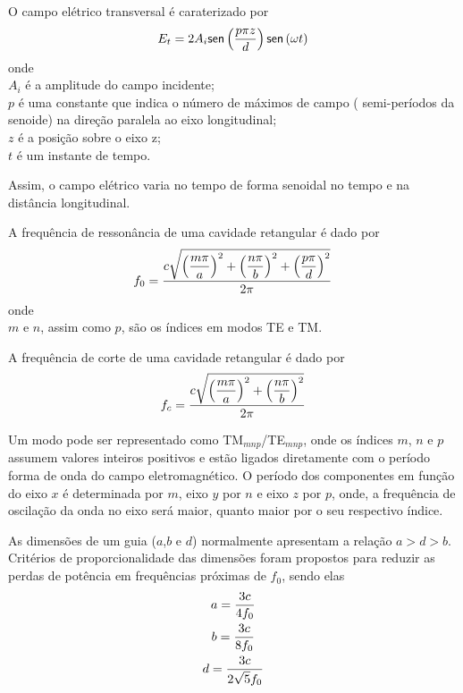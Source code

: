 O campo elétrico transversal é caraterizado por 
\begin{equation}
E_t=2A_i\mathsf{sen}\left(\displaystyle \frac{\displaystyle p\pi z }{ \displaystyle d}\right)\mathsf{sen}\left(\omega t\right)
\end{equation}
onde\\
$A_i$ é a amplitude do campo incidente;\\
$p$ é uma constante que indica o número de máximos de campo ( semi-períodos da senoide) na direção paralela ao eixo longitudinal;\\
$z$ é a posição sobre o eixo z;\\
$t$ é um instante de tempo.


Assim, o campo elétrico varia no tempo de forma senoidal no tempo e na distância longitudinal.


A frequência de ressonância de uma cavidade retangular é dado por
\begin{equation}
f_0=\displaystyle \frac{\displaystyle c \sqrt{\left(\displaystyle \frac{\displaystyle m\pi }{ \displaystyle a}\right)^2+\left(\displaystyle \frac{\displaystyle n\pi }{ \displaystyle b}\right)^2+\left(\displaystyle \frac{\displaystyle p\pi }{ \displaystyle d}\right)^2} }{ \displaystyle 2\pi}
\end{equation}
onde\\
$m$ e $n$, assim como $p$, são os índices em modos TE e TM.


A frequência de corte de uma cavidade retangular é dado por
\begin{equation}
	f_c=\displaystyle \frac{\displaystyle c \sqrt{\left(\displaystyle \frac{\displaystyle m\pi }{ \displaystyle a}\right)^2+\left(\displaystyle \frac{\displaystyle n\pi }{ \displaystyle b}\right)^2} }{ \displaystyle 2\pi}
\end{equation}

Um modo pode ser representado como TM$_{mnp}$/TE$_{mnp}$, onde os índices $m$, $n$ e $p$ assumem valores inteiros positivos e estão ligados diretamente com o período forma de onda do campo eletromagnético. O período dos componentes em função do eixo $x$ é determinada por $m$, eixo $y$ por $n$ e eixo $z$ por $p$, onde, a frequência de oscilação da onda no eixo será maior, quanto maior por o seu respectivo índice.
	

As dimensões de um guia ($a$,$b$ e $d$) normalmente apresentam a relação $a>d>b$. Critérios de proporcionalidade das dimensões foram propostos para reduzir as perdas de potência em frequências próximas de $f_0$, sendo elas
\begin{gather*}
a=\displaystyle \frac{\displaystyle 3c }{ \displaystyle 4f_0}\\
b=\displaystyle \frac{\displaystyle 3c }{ \displaystyle 8f_0}\\	
d=\displaystyle \frac{\displaystyle 3c }{ \displaystyle 2\sqrt{5}f_0}\\
\end{gather*}

